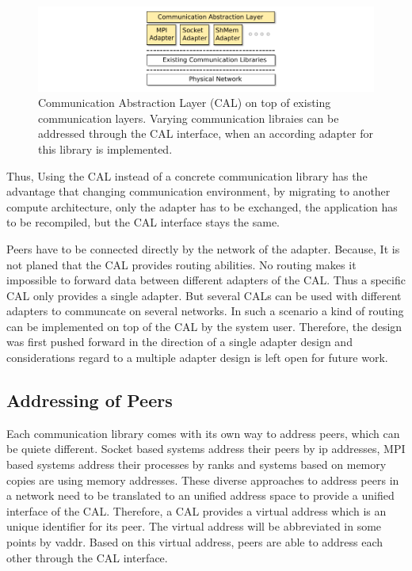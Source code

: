 \begin{figure}[H]
  \centering
  \includegraphics[width=\textwidth]{graphics/30_design_cal}
  \caption{Communication Abstraction Layer (CAL) on top of existing
    communication layers. Varying communication libraies can be
    addressed through the CAL interface, when an according adapter for
    this library is implemented.}
  \label{fig:cal}
\end{figure}

Thus, Using the CAL instead of a concrete communication library has
the advantage that changing communication environment, by migrating to
another compute architecture, only the adapter has to be exchanged,
the application has to be recompiled, but the CAL interface stays the
same.

Peers have to be connected directly by the network of the
adapter. Because, It is not planed that the CAL provides routing
abilities. No routing makes it impossible to forward data between
different adapters of the CAL. Thus a specific CAL only provides a
single adapter. But several CALs can be used with different adapters
to communcate on several networks. In such a scenario a kind of
routing can be implemented on top of the CAL by the system
user. Therefore, the design was first pushed forward in the direction
of a single adapter design and considerations regard to a multiple
adapter design is left open for future work.


\subsection{Addressing of Peers}
Each communication library comes with its own way to address peers,
which can be quiete different. Socket based systems address their
peers by ip addresses, MPI based systems address their processes by
ranks and systems based on memory copies are using memory addresses.
These diverse approaches to address peers in a network need to be
translated to an unified address space to provide a unified interface of the CAL.
Therefore, a CAL provides a virtual address which is an unique
identifier for its peer. The virtual address
will be abbreviated in some points by vaddr. Based on this virtual
address, peers are able to address each other through the CAL
interface.

